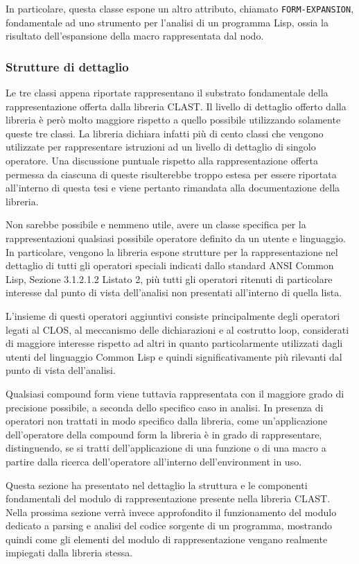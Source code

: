 In particolare, questa classe espone un altro attributo, chiamato \texttt
{FORM-EXPANSION}, fondamentale ad uno strumento per l’analisi di un programma
Lisp, ossia la risultato dell’espansione della macro rappresentata dal nodo.

\subsubsection{Strutture di dettaglio}

Le tre classi appena riportate rappresentano il substrato fondamentale della
rappresentazione offerta dalla libreria CLAST. Il livello di dettaglio offerto
dalla libreria è però molto maggiore rispetto a quello possibile utilizzando
solamente queste tre classi. La libreria dichiara infatti più di cento classi
che vengono utilizzate per rappresentare istruzioni ad un livello di dettaglio
di singolo operatore. Una discussione puntuale rispetto alla rappresentazione
offerta permessa da ciascuna di queste risulterebbe troppo estesa per essere
riportata all’interno di questa tesi e viene pertanto rimandata alla
documentazione della libreria.

Non sarebbe possibile e nemmeno utile, avere un classe specifica per la
rappresentazioni qualsiasi possibile operatore definito da un utente e
linguaggio. In particolare, vengono la libreria espone strutture per la
rappresentazione nel dettaglio di tutti gli operatori speciali indicati dallo
standard ANSI Common Lisp, Sezione 3.1.2.1.2 Listato 2, più tutti gli operatori
ritenuti di particolare interesse dal punto di vista dell’analisi non presentati
all’interno di quella lista.

L'insieme di questi operatori aggiuntivi consiste principalmente degli
operatori legati al CLOS, al meccanismo delle dichiarazioni e al costrutto
loop, considerati di maggiore interesse rispetto ad altri in quanto
particolarmente utilizzati dagli utenti del linguaggio Common Lisp e quindi
significativamente più rilevanti dal punto di vista dell’analisi.

Qualsiasi compound form viene tuttavia rappresentata con il maggiore grado di
precisione possibile, a seconda dello specifico caso in analisi. In presenza di
operatori non trattati in modo specifico dalla libreria, come un'applicazione
dell'operatore della compound form la libreria è in grado di rappresentare,
distinguendo, se si tratti dell’applicazione di una funzione o di una macro a
partire dalla ricerca dell'operatore all'interno dell'environment in uso.

Questa sezione ha presentato nel dettaglio la struttura e le componenti
fondamentali del modulo di rappresentazione presente nella libreria CLAST.
Nella prossima sezione verrà invece approfondito il funzionamento del modulo
dedicato a parsing e analisi del codice sorgente di un programma, mostrando
quindi come gli elementi del modulo di rappresentazione vengano realmente
impiegati dalla libreria stessa.
